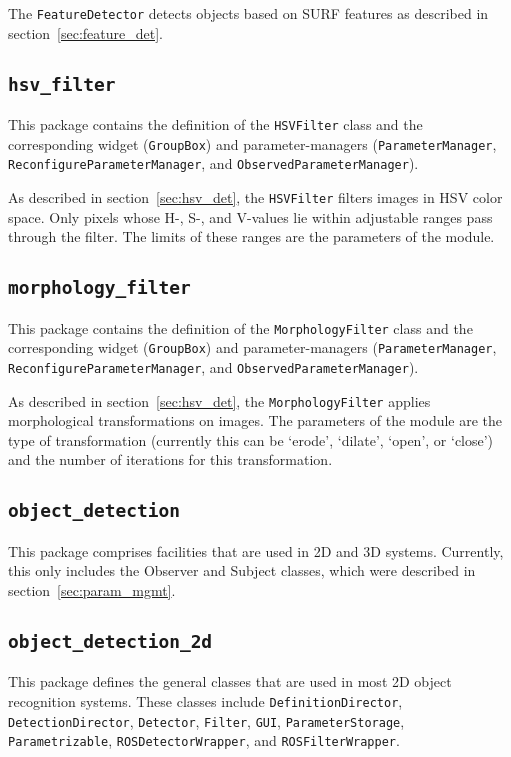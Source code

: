 \documentclass{article}
\newcommand{\code}[1]{\texttt{#1}}
\begin{document}
The \code{FeatureDetector} detects objects based on SURF features as
described in section~\ref{sec:feature_det}.


\subsection{\code{hsv\_filter}}
This package contains the definition of the \code{HSVFilter} class
and the corresponding widget (\code{GroupBox}) and parameter-managers
(\code{ParameterManager}, \code{ReconfigureParameterManager}, and
\code{ObservedParameterManager}).

As described in section~\ref{sec:hsv_det}, the \code{HSVFilter} filters
images in HSV color space. Only pixels whose H-, S-, and V-values lie
within adjustable ranges pass through the filter. The limits of these
ranges are the parameters of the module.


\subsection{\code{morphology\_filter}}
This package contains the definition of the \code{MorphologyFilter} class
and the corresponding widget (\code{GroupBox}) and parameter-managers
(\code{ParameterManager}, \code{ReconfigureParameterManager}, and
\code{ObservedParameterManager}).

As described in section~\ref{sec:hsv_det}, the \code{MorphologyFilter}
applies morphological transformations on images.
The parameters of the module are the type of transformation (currently
this can be `erode', `dilate', `open', or `close') and the number
of iterations for this transformation.


\subsection{\code{object\_detection}}
This package comprises facilities that are used in 2D and 3D systems.
Currently, this only includes the Observer and Subject classes, which
were described in section~\ref{sec:param_mgmt}.


\subsection{\code{object\_detection\_2d}}

This package defines the general classes that are used in most
2D object recognition systems.
These classes include
\code{DefinitionDirector}, \code{DetectionDirector},
\code{Detector}, \code{Filter},
\code{GUI},
\code{ParameterStorage}, \code{Parametrizable},
\code{ROSDetectorWrapper}, and \code{ROSFilterWrapper}.
\end{document}
